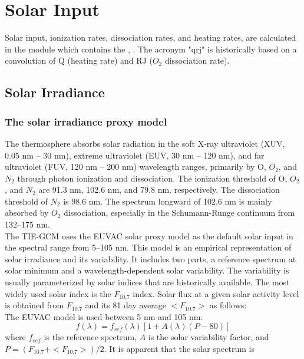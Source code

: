 %
\section{Solar Input} \label{cap:solar_input}
%
Solar input, ionization rates, dissociation rates, and heating rates, 
are calculated in the module  which contains the , 
.  The acronym "qrj" is historically 
based on a convolution of Q (heating rate) and RJ ($O_2$ dissociation rate).
\\
\subsection{Solar Irradiance} \label{cap:solar_irradiance}
%
\subsubsection{The solar irradiance proxy model}
The thermosphere absorbs solar radiation in the soft X-ray ultraviolet 
(XUV, 0.05 nm -- 30 nm), extreme ultraviolet (EUV, 30 nm -- 120 nm), and 
far ultraviolet (FUV, 120 nm -- 200 nm) wavelength ranges, primarily by 
O, $O_2$, and $N_2$ through photon ionization and dissociation. The 
ionization threshold of O, $O_2$, and $N_2$ are 91.3 nm, 102.6 nm, and 
79.8 nm, respectively. The dissociation threshold of $N_2$ is 98.6 nm. 
The spectrum longward of 102.6 nm is mainly absorbed by $O_2$ dissociation,
 especially in the Schumann-Runge continuum from 132--175 nm. \\ 
The TIE-GCM uses the EUVAC solar proxy model as the default solar 
input \cite{Richards1994} in the spectral range from 5--105 nm.  
This model is an empirical representation of solar irradiance and its 
variability. It includes two parts, a reference spectrum at solar 
minimum and a wavelength-dependent solar variability. The variability 
is usually parameterized by solar indices that are historically 
available. The most widely used solar index is the $F_{10.7}$ index. 
Solar flux at a given solar activity level is obtained from $F_{10.7}$ and 
its 81 day average $< F_{10.7} >$ as follows:\\
The EUVAC model \cite{Richards1994} is used between 5 nm and 105 
nm. 
%        
\begin{equation}
   f(\lambda) = f_{ref}(\lambda)[1+A(\lambda)(P-80)]
\end{equation}
%	
where $f_{ref}$ is the reference spectrum, $A$ is the solar variability factor, 
and $P = (F_{10.7} + <F_{10.7}>) / 2.$  It is apparent that the solar spectrum is 
